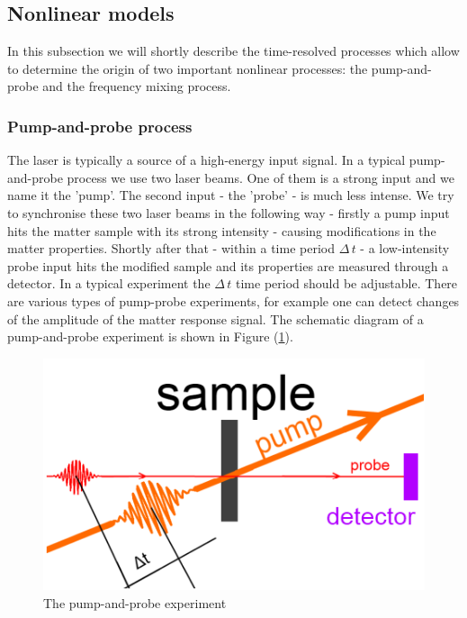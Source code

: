 \documentclass[12pt,twoside,a4paper]{article}
\numberwithin{equation}{subsection}
\numberwithin{figure}{subsection}
\begin{document}
\subsection{Nonlinear models} \label{chap:physical_simnlo}

In this subsection we will shortly describe the time-resolved processes which allow to determine the origin of two important nonlinear
processes: the pump-and-probe and the frequency mixing process.

\subsubsection*{Pump-and-probe process} \label{chap:physical_pnp}

The laser is typically a source of a high-energy input signal. In a typical pump-and-probe process we use two laser beams. One of them
is a strong input and we name it the 'pump'. The second input - the 'probe' - is much less intense. We try to synchronise these two
laser beams in the following way - firstly a pump input hits the matter sample with its strong intensity - causing modifications in the matter
properties. Shortly after that - within a time period $\Delta \, t$ - a low-intensity probe input hits the modified sample and its
properties are measured through a detector. In a typical experiment the $\Delta \, t$ time period should be adjustable. There are various types of
pump-probe experiments, for example one can detect changes of the amplitude of the matter response signal. The schematic diagram of a
pump-and-probe experiment is shown in Figure (\ref{fig:physical_pnp_fig}).

\begin{figure} 
	\begin{center}
		\includegraphics{img/pnp.png}
		\caption{The pump-and-probe experiment\label{fig:physical_pnp_fig}}
	\end{center}
\end{figure}
\end{document}
